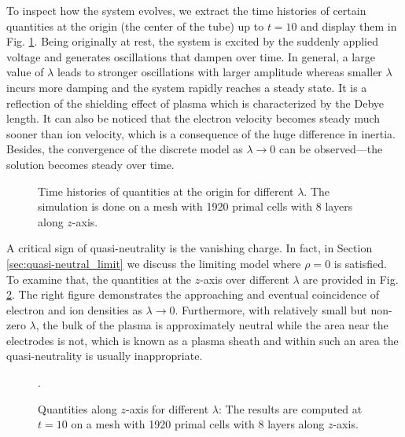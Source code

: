 \documentclass{article}
\begin{document}
To inspect how the system evolves, we extract the time histories of certain quantities at the origin (the center of the tube) up to $t = 10$ and display them in Fig. \ref{fig:origin-data_vs_time}. Being originally at rest, the system is excited by the suddenly applied voltage and generates oscillations that dampen over time. In general, a large value of $\lambda$ leads to stronger oscillations with larger amplitude whereas smaller $\lambda$ incurs more damping and the system rapidly reaches a steady state. It is a reflection of the shielding effect of plasma which is characterized by the Debye length. It can also be noticed that the electron velocity becomes steady much sooner than ion velocity, which is a consequence of the huge difference in inertia. Besides, the convergence of the discrete model as $\lambda \rightarrow 0$ can be observed---the solution becomes steady over time.
\begin{figure}
    \centering
    \caption{Time histories of quantities at the origin for different $\lambda$. The simulation is done on a mesh with 1920 primal cells with 8 layers along $z$-axis.}
    \label{fig:origin-data_vs_time}
\end{figure}

A critical sign of quasi-neutrality is the vanishing charge. In fact, in Section \ref{sec:quasi-neutral_limit} we discuss the limiting model where $\rho = 0$ is satisfied. To examine that, the quantities at the $z$-axis over different $\lambda$ are provided in Fig. \ref{fig:zaxis-data_vs_z-T_10}. The right figure demonstrates the approaching and eventual coincidence of electron and ion densities as $\lambda \rightarrow 0$. Furthermore, with relatively small but non-zero $\lambda$, the bulk of the plasma is approximately neutral while the area near the electrodes is not, which is known as a plasma sheath and within such an area the quasi-neutrality is usually inappropriate.
\begin{figure}
    \centering
    \caption{Quantities along $z$-axis for different $\lambda$: The results are computed at $t = 10$ on a mesh with 1920 primal cells with 8 layers along $z$-axis.}.
    \label{fig:zaxis-data_vs_z-T_10}
\end{figure}
\end{document}
